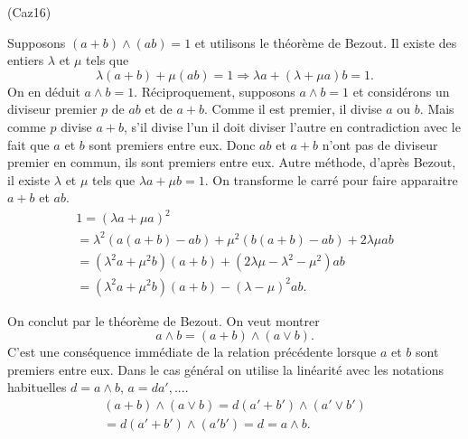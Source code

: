 \begin{tiny}(Caz16)\end{tiny} Supposons $(a+b)\wedge(ab) = 1$ et utilisons le théorème de Bezout. Il existe des entiers $\lambda$ et $\mu$ tels que
\[
 \lambda(a+b) + \mu(ab)= 1 
 \Rightarrow
 \lambda a + (\lambda + \mu a) b = 1.
\]
On en déduit $a\wedge b =1$.\newline
Réciproquement, supposons $a\wedge b = 1$ et considérons un diviseur premier $p$ de $ab$ et de $a+b$. Comme il est premier, il divise $a$ ou $b$. Mais comme $p$ divise $a+b$, s'il divise l'un il doit diviser l'autre en contradiction avec le fait que $a$ et $b$ sont premiers entre eux. Donc $ab$ et $a+b$ n'ont pas de diviseur premier en commun, ils sont premiers entre eux.\newline
Autre méthode, d'après Bezout, il existe $\lambda$ et $\mu$ tels que $\lambda a + \mu b = 1$. On transforme le carré pour faire apparaitre $a+b$ et $ab$.
\begin{multline*}
 1 = (\lambda a + \mu a)^2 \\
 = \lambda^2 \left( a(a+b) -ab\right) + \mu^2\left( b(a+b) - ab\right) + 2\lambda \mu ab\\
 = \left( \lambda^2 a + \mu^2 b\right) (a+b) + \left(2\lambda \mu -\lambda^2 - \mu^2 \right) ab \\
 = \left( \lambda^2 a + \mu^2 b\right) (a+b) - (\lambda - \mu)^2 ab .
\end{multline*}

On conclut par le théorème de Bezout.
On veut montrer
\[
a\wedge b=(a+b)\wedge (a\vee b).
\]
C'est une conséquence immédiate de la relation précédente lorsque $a$ et $b$ sont premiers entre eux. Dans le cas général on utilise la linéarité avec les notations habituelles $d =a \wedge b$, $a = da', ...$.
\begin{multline*}
 (a+b)\wedge(a\vee b) = d (a'+b')\wedge (a'\vee b') \\
 = d (a'+b')\wedge (a'b') = d = a\wedge b.
\end{multline*}
